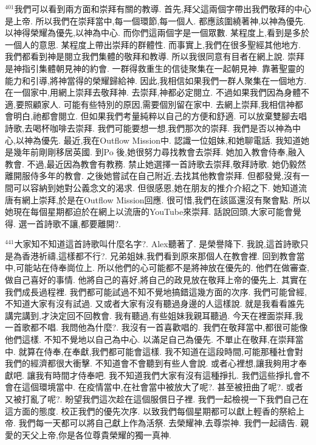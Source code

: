 \documentclass{book}
\begin{document}
$^{401}$我們可以看到兩方面和崇拜有關的教導.
首先,拜父這兩個字帶出我們敬拜的中心是上帝.
所以我們在崇拜當中,每一個環節,每一個人.
都應該圍繞著神,以神為優先.
以神得榮耀為優先,以神為中心.
而你們這兩個字是一個眾數.
某程度上,看到是多於一個人的意思.
某程度上帶出崇拜的群體性.
而事實上,我們在很多聖經其他地方.
我們都看到神是閱立我們集體的敬拜和教導.
所以我很同意有目者在網上說.
崇拜是神指引集體朝見神的約會.
一群得救重生的信徒聚集在一起朝見神.
靠著聖靈的能力和引導,將神當得的榮耀歸給神.
因此,我相信如果我們一群人聚集在一個地方.
在一個家中,用網上崇拜去敬拜神.
去崇拜,神都必定閱立.
不過如果我們因為身體不適,要照顧家人.
可能有些特別的原因,需要個別留在家中.
去網上崇拜,我相信神都會明白,祂都會閱立.
但如果我們考量純粹以自己的方便和舒適.
可以放棄雙腳去唱詩歌,去喝杯咖啡去崇拜.
我們可能要想一想,我們那次的崇拜.
我們是否以神為中心,以神為優先.
最近,我在Outflow Mission中.
認識一位姐妹,和她聊電話.
我知道她是幾年前剛剛移居英國.
到Po 後,她很努力尋找教會去崇拜.
她加入教會侍奉,融入教會.
不過,最近因為教會有教務.
禁止她選擇一首詩歌去崇拜,敬拜詩歌.
她仍毅然離開服侍多年的教會.
之後她嘗試在自己附近,去找其他教會崇拜.
但都發覺,沒有一間可以容納到她對公義念文的渴求.
但很感恩,她在朋友的推介介紹之下.
她知道流唐有網上崇拜,於是在Outflow Mission回應.
很可惜,我們在該區還沒有聚會點.
所以她現在每個星期都迫於在網上以流唐的YouTube來崇拜.
話說回頭,大家可能會覺得.
選一首詩歌不讓,都要離開?.

$^{441}$大家知不知道這首詩歌叫什麼名字?.
Alex聽著了.
是榮譽降下.
我說,這首詩歌只是為香港祈禱,這樣都不行?.
兄弟姐妹,我們看到原來那個人在教會裡.
回到教會當中,可能站在侍奉崗位上.
所以他們的心可能都不是將神放在優先的.
他們在做審查,做自己喜好的事情.
他將自己的喜好,將自己的政見放在敬拜上帝的優先上.
其實在我們成長過程裡.
我們都可能試過不知不覺地搞錯這幾方面的次序.
我們可能曾經,不知道大家有沒有試過.
又或者大家有沒有聽過身邊的人這樣說.
就是我看看誰先講完講到,才決定回不回教會.
我有聽過,有些姐妹我親耳聽過.
今天在裡面崇拜,我一首歌都不唱.
我問他為什麼?.
我沒有一首喜歡唱的.
我們在敬拜當中,都很可能像他們這樣.
不知不覺地以自己為中心.
以滿足自己為優先.
不單止在敬拜,在崇拜當中.
就算在侍奉,在奉獻,我們都可能會這樣.
我不知道在這段時間,可能那種社會對我們的經濟都很大衝擊.
不知道會不會聽到有些人會說.
或者心裡想,讓我夠用才奉獻吧.
讓我有時間才侍奉吧.
我不知道我們大家有沒有這種掙扎.
我們這些掙扎會不會在這個環境當中.
在疫情當中,在社會當中被放大了呢?.
甚至被扭曲了呢?.
或者又被打亂了呢?.
盼望我們這次趁在這個服償日子裡.
我們一起檢視一下我們自己在這方面的態度.
校正我們的優先次序.
以致我們每個星期都可以獻上輕香的祭給上帝.
我們每一天都可以將自己獻上作為活祭.
去榮耀神,去尊崇神.
我們一起禱告.
親愛的天父上帝,你是各位尊貴榮耀的獨一真神.
\end{document}
